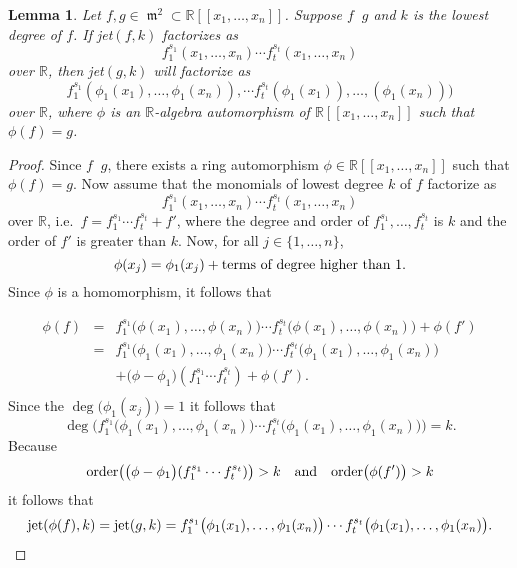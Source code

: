 \documentclass[noend]{amsproc}
\DeclareMathOperator{\requiv}{\overset{r}{\sim}}
\DeclareMathOperator{\m}{\mathfrak{m}}
\begin{document}
\newtheorem{kjet}{Lemma}[section]
\begin{kjet}\label{kjet}
Let $f,g\in \m^2\subset\mathbb R[[x_1,\ldots,x_n]]$. Suppose $f\requiv g$
and $k$
is the lowest degree of $f$. If jet$(f,k)$ factorizes as
\[f_1^{s_1}(x_1,\ldots,x_n)\cdots f_t^{s_t}(x_1,\ldots,x_n)\]
over $\mathbb R$, then jet$(g,k)$ will factorize
as \[f_1^{s_1} (\phi_1(x_1),\ldots,\phi_1(x_n)),\cdots
f_t^{s_t}(\phi_1(x_1)),\ldots,(\phi_1(x_n)))\] over $\mathbb R$, where $\phi$
is an $\mathbb R$-algebra automorphism of $\mathbb R[[x_1,\ldots,x_n]]$
such that $\phi(f)=g$.
\end{kjet}
\begin{proof}
Since $f\requiv g$, there exists a ring automorphism $\phi\in\mathbb
R[[x_1,\ldots,x_n]]$ such that  $\phi(f)=g$. Now
assume that the monomials of lowest degree $k$ of $f$ factorize
as \[f_1^{s_1}(x_1,\ldots,x_n)\cdots f_t^{s_t}(x_1,\ldots,x_n)\] over
$\mathbb R$, i.e.~$f=f_1^{s_1}\cdots f_t^{s_t}+f'$, where the degree and order
of
$f_1^{s_1},\ldots,f_t^{s_t}$ is $k$ and the order of $f'$ is greater than $k$.
Now, for all $j\in\{1,\ldots,n\}$, \[\phi(x_j)=\phi_1(x_j)+\textnormal{terms of
degree higher than $1$}.\] Since $\phi$ is a homomorphism, it follows that

\begin{eqnarray*}
\phi(f)&=&f_1^{s_1}\big(\phi(x_1),\ldots,\phi(x_n)\big)\cdots
f_t^{s_t}\big(\phi(x_1),\ldots,\phi(x_n)\big)+\phi(f')\\
&=&f_1^{s_1}\big(\phi_1(x_1),\ldots,\phi_1(x_n)\big)\cdots
f_t^{s_t}\big(\phi_1(x_1),\ldots,\phi_1(x_n)\big)\\
&&+\big(\phi-\phi_1\big)(f_1^{s_1}\cdots f_t^{s_t})+\phi(f').\\
\end{eqnarray*}
Since the $\deg\big(\phi_1(x_j))=1$ it follows that
\[\deg\big(f_1^{s_1}\big(\phi_1(x_1),\ldots,\phi_1(x_n)\big)\cdots
f_t^{s_t}\big(\phi_1(x_1),\ldots,\phi_1(x_n)\big)\big)=k.\] Because
\[
\textnormal{order}\big(\big(\phi-\phi_1\big)(f_1^{s_1}\cdots f_t^{s_t})\big)>k
\quad\textnormal{and}\quad\textnormal{order}\big(\phi(f')\big)>k
\]
it follows that
\begin{eqnarray*}
\textnormal{jet}(\phi(f),k)=\textnormal{jet}(g,k)
=f_1^{s_1}\big(\phi_1(x_1),\ldots,\phi_1(x_n)\big)\cdots
f_t^{s_t}\big(\phi_1(x_1),\ldots,\phi_1(x_n)\big).
\end{eqnarray*}
\end{proof}
\end{document}
